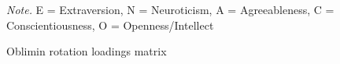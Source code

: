 \documentclass[
  english,
  man, fleqn, noextraspace]{apa6}
\begin{document}
\begin{table}[tbp]
\begin{center}
\begin{threeparttable}
{}

\begin{tablenotes}[para]
\normalsize{\textit{Note.} E = Extraversion, N = Neuroticism, A = Agreeableness, C = Conscientiousness, O = Openness/Intellect}
\end{tablenotes}

\end{threeparttable}
\end{center}

\end{table}

\begin{table}[tbp]

\begin{center}
\begin{threeparttable}

\caption{\label{tab:obliminTable}Oblimin rotation loadings matrix}

\tiny{

}
\end{threeparttable}
\end{center}
\end{table}
\end{document}
